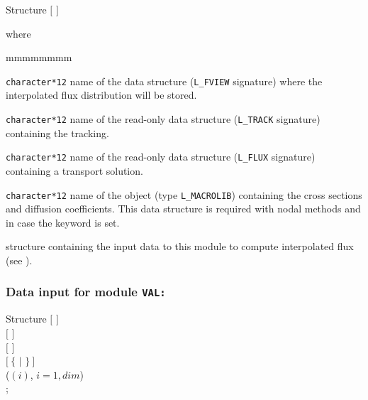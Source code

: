 \begin{DataStructure}{Structure }
 \moc{:=}    $[$  $]$ \moc{::}  
\end{DataStructure}

\noindent
where
\begin{ListeDeDescription}{mmmmmmmm}

\item[\dusa{IFLU}] {\tt character*12} name of the data
structure ({\tt L\_FVIEW} signature) where the interpolated flux distribution will be stored.

\item[\dusa{TRKNAM}] {\tt character*12} name of the read-only  data
structure ({\tt L\_TRACK} signature) containing the tracking. 

\item[\dusa{FLUNAM}] {\tt character*12} name of the read-only  data
structure ({\tt L\_FLUX} signature) containing a transport solution.

\item[\dusa{MACRO}] {\tt character*12} name of the  object (type {\tt L\_MACROLIB}) containing the cross sections and diffusion coefficients.
This data structure is required with nodal methods and in case the  keyword is set.

\item[\dstr{descval}] structure containing the input data to this module to compute interpolated flux
(see ).

\end{ListeDeDescription}

\subsubsection{Data input for module {\tt VAL:}}\label{sect:descval}

\begin{DataStructure}{Structure }
$[$   $]$ \\
$[$   $]$ \\
$[$   $]$ \\
$[~\{$  $|$  $\}~]$ \\
  ($(i)$, $i=1,dim$) \\
;
\end{DataStructure}

